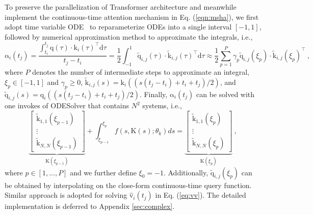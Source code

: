 \documentclass{article}
\begin{document}
To preserve the parallelization of Transformer architecture and meanwhile implement the continuous-time attention mechanism in Eq. (\ref{eqn:msha}), we first adopt time variable ODE~\cite{chen2021neuralstpp} to reparameterize ODEs into a single interval $[-1, 1]$, followed by numerical approximation method to approximate the integrals, i.e.,
\begin{equation}
    \boldsymbol{\mathrm{\alpha}}_i(t_j) = \frac{\int_{t_i}^{t_j} \boldsymbol{\mathrm{q}}(\tau) \cdot \boldsymbol{\mathrm{k}}_i(\tau)^\top \text{d}\tau}{t_j - t_i} = \frac{1}{2} \int_{-1}^{1} \tilde{\boldsymbol{\mathrm{q}}}_{i,j}(\tau) \cdot \tilde{\boldsymbol{\mathrm{k}}}_{i,j}(\tau)^\top \text{d} \tau \approx  \frac{1}{2} \sum_{p=1}^{P} \gamma_p \tilde{\boldsymbol{\mathrm{q}}}_{i,j}(\xi_p) \cdot \tilde{\boldsymbol{\mathrm{k}}}_{i,j}(\xi_p)^{\top} ~,
\label{eq:app}
\end{equation}
where $P$ denotes the number of intermediate steps to approximate an integral, $\xi_p \in [-1, 1]$ and $\gamma_p \geq 0$, $\tilde{\boldsymbol{\mathrm{k}}}_{i,j}(s) = \boldsymbol{\mathrm{k}}_i\left((s(t_j - t_i) + t_i + t_j)/2\right)$, and $\tilde{\boldsymbol{\mathrm{q}}}_{i,j}(s) = \boldsymbol{\mathrm{q}}_i\left((s(t_j - t_i) + t_i + t_j)/2\right)$. Finally, $\boldsymbol{\mathrm{\alpha}}_i(t_j)$ can be solved with one invokes of ODESolver that contains $N^2$ systems, i.e., 
\begin{equation}
    \underbrace{\begin{bmatrix}
    \tilde{\boldsymbol{\mathrm{k}}}_{1, 1}(\xi_{p-1}) \\
    \vdots \\
    \tilde{\boldsymbol{\mathrm{k}}}_{N,N}(\xi_{p-1})
    \end{bmatrix}}_{\boldsymbol{\mathrm{K}}(\xi_{p-1})} + \int_{\xi_{p-1}}^{\xi_{p}} f(s, \boldsymbol{\mathrm{K}}(s); \theta_k) ds =
    \underbrace{\begin{bmatrix}
    \tilde{\boldsymbol{\mathrm{k}}}_{1, 1}(\xi_{p}) \\
    \vdots \\
    \tilde{\boldsymbol{\mathrm{k}}}_{N, N}(\xi_{p})
    \end{bmatrix}}_{\boldsymbol{\mathrm{K}}(\xi_{p})} ~,
\label{eq:solve}
\end{equation}
where $p \in [1, ..., P]$ and we further define $\xi_0=-1$. Additionally, $\tilde{\boldsymbol{\mathrm{q}}}_{i,j}(\xi_p)$ can be obtained by interpolating on the close-form continuous-time query function. Similar approach is adopted for solving $\widehat{\boldsymbol{\mathrm{v}}}_i(t_j)$ in Eq. (\ref{eq:vv}).
The detailed implementation is deferred to Appendix \ref{sec:complex}.
\end{document}
